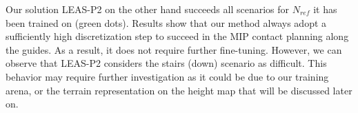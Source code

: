Our solution LEAS-P2 on the other hand succeeds all scenarios for $N_{ref}$ it has been trained on (green dots).
Results show that our method always adopt a sufficiently high discretization step to succeed in the MIP contact planning along the guides. %
As a result, it does not require further fine-tuning.
However, we can observe that LEAS-P2 considers the stairs (down) scenario as difficult.
This behavior may require further investigation as it could be due to our training arena, or the terrain representation on the height map that will be discussed later on.


